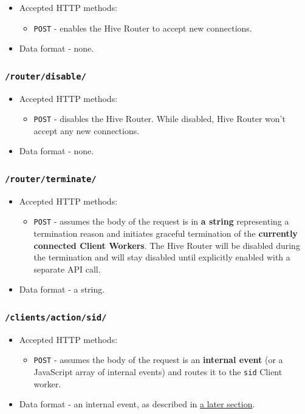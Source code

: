 \documentclass[a4paper]{article}
\begin{document}
\begin{itemize}
\item Accepted HTTP methods:
\begin{itemize}
\item \texttt{POST} - enables the Hive Router to accept new connections.
\end{itemize}
\item Data format - none.
\end{itemize}
\subsubsection{\texttt{/router/disable/}}
\label{sec-6-1-3}


\begin{itemize}
\item Accepted HTTP methods:
\begin{itemize}
\item \texttt{POST} - disables the Hive Router. While disabled, Hive Router won't accept any new connections.
\end{itemize}
\item Data format - none.
\end{itemize}
\subsubsection{\texttt{/router/terminate/}}
\label{sec-6-1-4}


\begin{itemize}
\item Accepted HTTP methods:
\begin{itemize}
\item \texttt{POST} - assumes the body of the request is in \textbf{a string} representing a termination reason and initiates graceful termination of the \textbf{currently connected Client Workers}. The Hive Router will be disabled during the termination and will stay disabled until explicitly enabled with a separate API call.
\end{itemize}
\item Data format - a string.
\end{itemize}
\subsubsection{\texttt{/clients/action/sid/}}
\label{sec-6-1-5}



\begin{itemize}
\item Accepted HTTP methods:
\begin{itemize}
\item \texttt{POST} - assumes the body of the request is an \textbf{internal event} (or a JavaScript array of internal events) and routes it to the \texttt{sid} Client worker.
\end{itemize}
\item Data format - an internal event, as described in \hyperref[sec-8-3]{a later section}.
\end{itemize}
\end{document}
